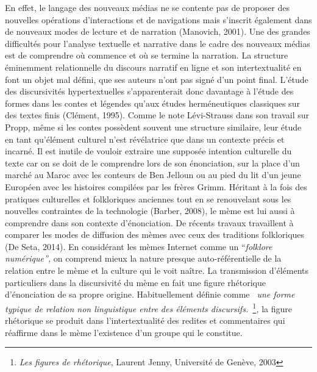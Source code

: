 {\color{black}
En effet, le langage des nouveaux m\'edias ne se contente pas de
proposer des nouvelles op\'erations d{\textquoteright}interactions et
de navigations mais s{\textquoteright}inscrit \'egalement dans de
nouveaux modes de lecture et de narration (Manovich, 2001). Une des
grandes difficult\'es pour l{\textquoteright}analyse textuelle et
narrative dans le cadre des nouveaux m\'edias est de comprendre o\`u
commence et o\`u se termine la narration. La structure \'eminemment
relationnelle du discours narratif en ligne et son intertextualit\'e en
font un objet mal d\'efini, que ses auteurs n{\textquoteright}ont pas
sign\'e d{\textquoteright}un point final. L{\textquoteright}\'etude des
discursivit\'es hypertextuelles s{\textquoteright}apparenterait donc
davantage \`a l{\textquoteright}\'etude des formes dans les contes et
l\'egendes qu{\textquoteright}aux \'etudes herm\'eneutiques classiques
sur des textes finis (Cl\'ement, 1995). Comme le note L\'evi-Strauss
dans son travail sur Propp, m\^eme si les contes poss\`edent souvent
une structure similaire, leur \'etude en tant
qu{\textquoteright}\'el\'ement culturel n{\textquoteright}est
r\'ev\'elatrice que dans un contexte pr\'ecis et incarn\'e. Il est
inutile de vouloir extraire une suppos\'ee intention culturelle du
texte car on se doit de le comprendre lors de son \'enonciation, sur la
place d{\textquoteright}un march\'e au Maroc avec les conteurs de Ben
Jelloun ou au pied du lit d{\textquoteright}un jeune Europ\'een avec
les histoires compil\'ees par les fr\`eres Grimm. H\'eritant \`a la
fois des pratiques culturelles et folkloriques anciennes tout en se
renouvelant sous les nouvelles contraintes de la technologie (Barber,
2008), le m\`eme est lui aussi \`a comprendre dans son contexte
d{\textquoteright}\'enonciation. De r\'ecents travaux travaillent \`a
comparer les modes de diffusion des m\`emes avec ceux des traditions
folkloriques (De Seta, 2014). En consid\'erant les m\`emes Internet
comme un {\textquotedblleft}\textit{folklore
num\'erique{\textquotedblright}, }on comprend mieux la nature presque
auto-r\'ef\'erentielle de la relation entre le m\`eme et la culture qui
le voit na\^itre. La transmission d{\textquoteright}\'el\'ements
particuliers dans la discursivit\'e du m\`eme en fait une figure
rh\'etorique d{\textquoteright}\'enonciation de sa propre origine.
Habituellement d\'efinie comme \textit{{\guillemotleft}~une forme
typique de relation non linguistique entre des \'el\'ements
discursifs.~{\guillemotright}}\footnote{ \textit{Les figures de
rh\'etorique}, Laurent Jenny, Universit\'e de Gen\`eve, 2003}\textit{,
}la figure rh\'etorique se produit dans
l{\textquoteright}intertextualit\'e des redites et commentaires qui
r\'eaffirme dans le m\`eme l{\textquoteright}existence
d{\textquoteright}un groupe qui le constitue. }

